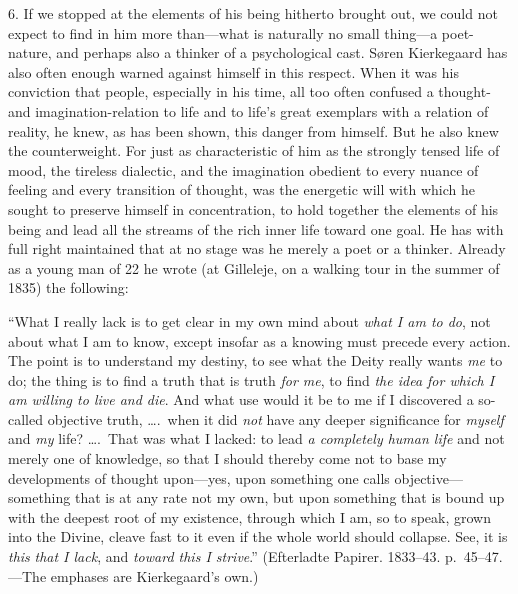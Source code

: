 \documentclass[12pt,a4paper]{book}
\newcommand{\opage}[1]{\marginnote{\footnotesize\textit{[#1]}}}
\begin{document}
\opage{44}6. If we stopped at the elements of his being hitherto brought
out, we could not expect to find in him more than---what is naturally no
small thing---a poet-nature, and perhaps also a thinker of a
psychological cast. Søren Kierkegaard has also often enough warned
against himself in this respect. When it was his conviction that people,
especially in his time, all too often confused a thought- and
imagination-relation to life and to life's great exemplars with a
relation of reality, he knew, as has been shown, this danger from
himself. But he also knew the counterweight. For just as characteristic
of him as the strongly tensed life of mood, the tireless dialectic, and
the imagination obedient to every nuance of feeling and every transition
of thought, was the energetic will with which he sought to preserve
himself in concentration, to hold together the elements of his being and
lead all the streams of the rich inner life toward one goal. He has with
full right maintained that at no stage was he merely a poet or a thinker.
Already as a young man of 22 he wrote (at Gilleleje, on a walking tour in
the summer of 1835) the following:

``What I really lack is to get clear in my own mind about \textit{what I
am to do}, not about what I am to know, except insofar as a knowing must
precede every action. The point is to understand my destiny, to see what
the Deity really wants \textit{me} to do; the thing is to find a truth
that is truth \textit{for me}, to find \textit{the idea for which I am
willing to live and die}. And what use would it be to me if I discovered
a so-called objective truth, \dots.\ when it did \textit{not} have any
deeper significance for \textit{myself} and \textit{my} life? \dots.\
That was what I lacked: to lead \textit{a completely human life} and not
merely one
\opage{45}of knowledge, so that I should thereby come not to base my
developments of thought upon---yes, upon something one calls
objective---something that is at any rate not my own, but upon something
that is bound up with the deepest root of my existence, through which I
am, so to speak, grown into the Divine, cleave fast to it even if the
whole world should collapse. See, it is \textit{this} \textit{that I
lack}, and \textit{toward this I strive}.'' (Efterladte Papirer.
1833--43. p.~45--47.---The emphases are Kierkegaard's own.)
\end{document}
